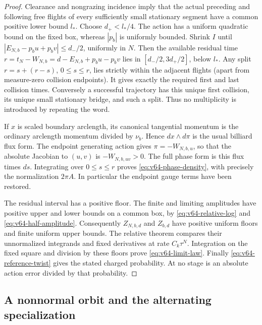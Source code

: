 \begin{proof}
Clearance and nongrazing incidence imply that the actual preceding and
following free flights of every sufficiently small stationary segment
have a common positive lower bound $l_*$.  Choose $d_+<l_*/4$.
The action has a uniform quadratic bound on the fixed box, whereas
$|p_b|$ is uniformly bounded.  Shrink $I$ until
$|E_{N,b}-p_bu+p_bv|\le d_-/2$, uniformly in $N$.
Then the available residual time
$r=t_N-W_{N,b}=d-E_{N,b}+p_bu-p_bv$ lies in
$[d_-/2,3d_+/2]$, below $l_*$.  Any split $r=s+(r-s)$,
$0\le s\le r$, lies strictly within the adjacent flights (apart from
measure-zero collision endpoints).  It gives exactly the required first
and last collision times.  Conversely a successful trajectory has this
unique first collision, its unique small stationary bridge, and such a
split.  Thus no multiplicity is introduced by repeating the word.

If $x$ is scaled boundary arclength, its canonical tangential momentum
is the ordinary arclength momentum divided by $\nu_b$.  Hence
$dx\wedge d\pi$ is the usual billiard flux form.  The endpoint
generating action gives $\pi=-W_{N,b,u}$, so that the absolute
Jacobian to $(u,v)$ is $-W_{N,b,uv}>0$.  The full phase form is this
flux times $ds$.  Integrating over $0\le s\le r$ proves
\eqref{eq:v64-phase-density}, with precisely the normalization
$2\pi A$.  In particular the endpoint gauge terms have been restored.

The residual interval has a positive floor.  The finite and limiting
amplitudes have positive upper and lower bounds on a common box, by
\eqref{eq:v64-relative-log} and \eqref{eq:v64-half-amplitude}.
Consequently $Z_{N,b,d}$ and $Z_{b,d}$ have positive uniform floors
and finite uniform upper bounds.  The relative theorem compares their
unnormalized integrands and fixed derivatives at rate $C_k\tau^N$.
Integration on the fixed square and division by these floors prove
\eqref{eq:v64-limit-law}.  Finally
\eqref{eq:v64-reference-twist} gives the stated charged probability.
At no stage is an absolute action error divided by that probability.
\end{proof}

\subsection{A nonnormal orbit and the alternating specialization}

